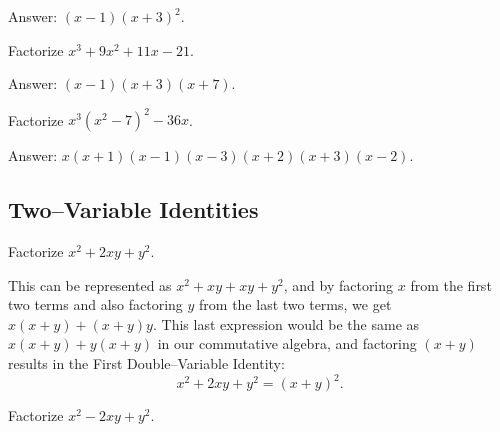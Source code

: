 \documentclass[12pt,a4paper]{memoir}
\theoremstyle{definition}
\begin{document}
\begin{solution}[name=Solution by Parviz Shahriari]
	Answer: $(x-1)(x+3)^2$.
\end{solution}


\begin{tcolorbox}
	\begin{question}
		Factorize $x^3+9x^2+11x-21$.
	\end{question}
\end{tcolorbox}

\begin{solution}[name=Solution by Parviz Shahriari]
	Answer: $(x-1)(x+3)(x+7)$.
\end{solution}


\begin{tcolorbox}
	\begin{question}
		Factorize $x^3(x^2-7)^2-36x$.
	\end{question}
\end{tcolorbox}

\begin{solution}[name=Solution by Parviz Shahriari]
	Answer: $x(x+1)(x-1)(x-3)(x+2)(x+3)(x-2)$.
\end{solution}

\newpage
\subsection{Two--Variable Identities}



\begin{tcolorbox}
	\begin{question}[name=(Positive Double--Variable Identity)]
		Factorize $x^2 + 2xy + y^2$.
	\end{question}
\end{tcolorbox}

\begin{solution}[name=Solution by Amir Parvardi]
	This can be represented as $x^2+xy+xy+y^2$, and by factoring $x$ from the first two terms and also factoring $y$ from the last two terms, we get $x(x+y)+(x+y)y$. This last expression would be the same as $x(x+y)+y(x+y)$ in our commutative algebra, and factoring $(x+y)$ results in the First Double--Variable Identity: $$x^2+2xy+y^2=(x+y)^2.$$
\end{solution}




\begin{tcolorbox}
	\begin{question}[name=(Negative Double--Variable Identity)]
		Factorize $x^2 - 2xy + y^2$.
	\end{question}
\end{tcolorbox}
\end{document}
